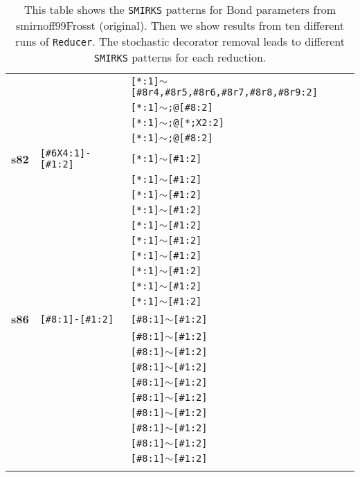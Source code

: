 \begin{longtable}{>{\baselineskip=10pt}p{} >{\baselineskip=10pt}p{} >{\baselineskip=10pt}p{}}
 &  & \texttt{[*:1]$\sim$[\#8r4,\#8r5,\#8r6,\#8r7,\#8r8,\#8r9:2]} \\ 
 &  & \texttt{[*:1]$\sim$;@[\#8:2]} \\ 
 &  & \texttt{[*:1]$\sim$;@[*;X2:2]} \\ 
 &  & \texttt{[*:1]$\sim$;@[\#8:2]} \\ 
\hline 
\textbf{s82} & \texttt{[\#6X4:1]-[\#1:2]} & \texttt{[*:1]$\sim$[\#1:2]} \\ 
 &  & \texttt{[*:1]$\sim$[\#1:2]} \\ 
 &  & \texttt{[*:1]$\sim$[\#1:2]} \\ 
 &  & \texttt{[*:1]$\sim$[\#1:2]} \\ 
 &  & \texttt{[*:1]$\sim$[\#1:2]} \\ 
 &  & \texttt{[*:1]$\sim$[\#1:2]} \\ 
 &  & \texttt{[*:1]$\sim$[\#1:2]} \\ 
 &  & \texttt{[*:1]$\sim$[\#1:2]} \\ 
 &  & \texttt{[*:1]$\sim$[\#1:2]} \\ 
 &  & \texttt{[*:1]$\sim$[\#1:2]} \\ 
\hline 
\textbf{s86} & \texttt{[\#8:1]-[\#1:2]} & \texttt{[\#8:1]$\sim$[\#1:2]} \\ 
 &  & \texttt{[\#8:1]$\sim$[\#1:2]} \\ 
 &  & \texttt{[\#8:1]$\sim$[\#1:2]} \\ 
 &  & \texttt{[\#8:1]$\sim$[\#1:2]} \\ 
 &  & \texttt{[\#8:1]$\sim$[\#1:2]} \\ 
 &  & \texttt{[\#8:1]$\sim$[\#1:2]} \\ 
 &  & \texttt{[\#8:1]$\sim$[\#1:2]} \\ 
 &  & \texttt{[\#8:1]$\sim$[\#1:2]} \\ 
 &  & \texttt{[\#8:1]$\sim$[\#1:2]} \\ 
 &  & \texttt{[\#8:1]$\sim$[\#1:2]} \\ 
\hline 
\caption{This table shows the \texttt{SMIRKS} patterns for Bond parameters from smirnoff99Frosst (original). Then we show results from ten different runs of \texttt{Reducer}. The stochastic decorator removal leads to different \texttt{SMIRKS} patterns for each reduction.}
\label{tab:bond_alkethoh}
\end{longtable}


